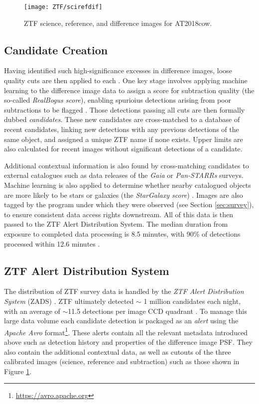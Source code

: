 \begin{figure}
	\centering \texttt{[image: ZTF/scirefdif]}
	\caption{ZTF science, reference, and difference images for AT2018cow.}
	\label{fig:ztf_scirefdif}
\end{figure} 

\subsection*{Candidate Creation}

Having identified such high-significance excesses in difference images, loose quality cuts are then applied to each \cite{ztf_data_processing}. One key stage involves applying machine learning to the difference image data to assign a score for subtraction quality (the so-called \emph{RealBogus score}), enabling spurioius detections arising from poor subtractions to be flagged \cite{ztf_ml_19}. Those detections passing all cuts are then formally dubbed \emph{candidates}. These new candidates are cross-matched to a database of recent candidates, linking new detections with any previous detections of the same object, and assigned a unique ZTF name if none exists. Upper limits are also calculated for recent images without significant detections of a candidate. 

Additional contextual information is also found by cross-matching candidates to external catalogues such as data releases of the \emph{Gaia} or \emph{Pan-STARRs} surveys. Machine learning is also applied to determine whether nearby catalogued objects are more likely to be stars or galaxies (the \emph{StarGalaxy score}) . Images are also tagged by the program under which they were observed (see Section \ref{sec:survey}), to ensure consistent data access rights downstream. All of this data is then passed to the ZTF Alert Distribution System. The median duration from exposure to completed data processing is 8.5 minutes, with 90\% of detections processed within 12.6 minutes \cite{ztf_data_processing}.

\subsection*{ZTF Alert Distribution System}

The distribution of ZTF survey data is handled by the \emph{ZTF Alert Distribution System} (ZADS) . ZTF ultimately detected $\sim$ 1 million candidates each night, with an average of $\sim$11.5 detections per image CCD quadrant \cite{ztf_data_processing}. To manage this large data volume each candidate detection is packaged as an \emph{alert} using the \emph{Apache Avro} format\footnote{\url{https://avro.apache.org}}. These alerts contain all the relevant metadata introduced above such as detection history and properties of the difference image PSF. They also contain the additional contextual data, as well as cutouts of the three calibrated images (science, reference and subtraction) such as those shown in Figure \ref{fig:ztf_scirefdif}.

